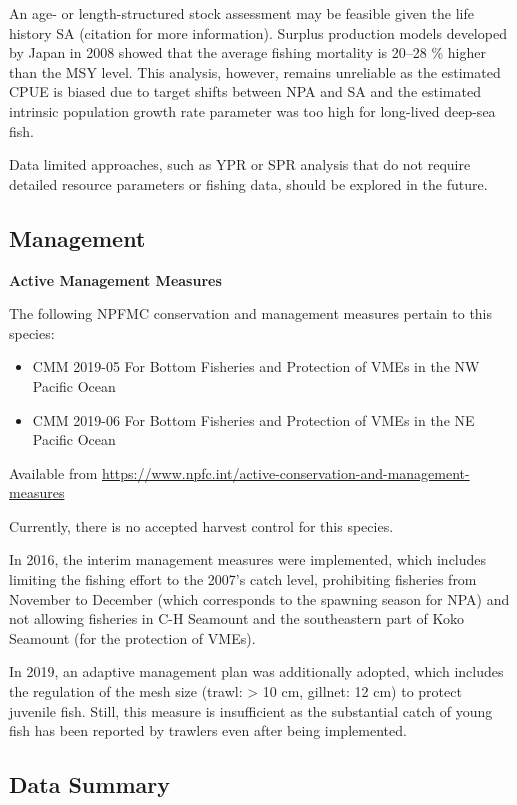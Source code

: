 \documentclass[
]{article}
\begin{document}
An age- or length-structured stock assessment may be feasible given the
life history SA (citation for more information). Surplus production
models developed by Japan in 2008 showed that the average fishing
mortality is 20--28 \% higher than the MSY level. This analysis,
however, remains unreliable as the estimated CPUE is biased due to
target shifts between NPA and SA and the estimated intrinsic population
growth rate parameter was too high for long-lived deep-sea fish.

Data limited approaches, such as YPR or SPR analysis that do not require
detailed resource parameters or fishing data, should be explored in the
future.

\hypertarget{management}{%
\subsection{Management}\label{management}}

\textbf{Active Management Measures}

The following NPFMC conservation and management measures pertain to this
species:

\begin{itemize}
\item
  CMM 2019-05 For Bottom Fisheries and Protection of VMEs in the NW
  Pacific Ocean
\item
  CMM 2019-06 For Bottom Fisheries and Protection of VMEs in the NE
  Pacific Ocean
\end{itemize}

Available from
\url{https://www.npfc.int/active-conservation-and-management-measures}

Currently, there is no accepted harvest control for this species.

In 2016, the interim management measures were implemented, which
includes limiting the fishing effort to the 2007's catch level,
prohibiting fisheries from November to December (which corresponds to
the spawning season for NPA) and not allowing fisheries in C-H Seamount
and the southeastern part of Koko Seamount (for the protection of VMEs).

In 2019, an adaptive management plan was additionally adopted, which
includes the regulation of the mesh size (trawl: \textgreater{} 10 cm,
gillnet: 12 cm) to protect juvenile fish. Still, this measure is
insufficient as the substantial catch of young fish has been reported by
trawlers even after being implemented.

\hypertarget{data-summary}{%
\subsection{Data Summary}\label{data-summary}}
\end{document}
